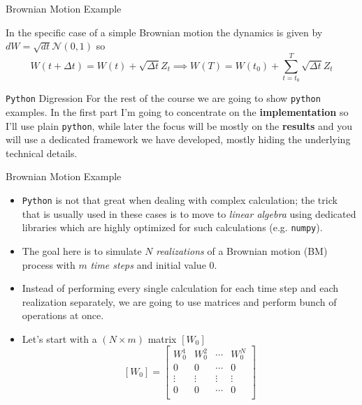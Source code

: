 \documentclass{beamer}
\begin{document}
\begin{frame}[fragile]{Brownian Motion Example}

In the specific case of a simple Brownian motion the dynamics is given by $dW = \sqrt{dt}\mathcal{N}(0,1)$ so
\begin{equation}
W(t+\Delta t) = W(t) + \sqrt{\Delta t}Z_t \implies
W(T) = W(t_0) + \sum_{t=t_0}^{T} \sqrt{\Delta t}Z_t
\label{eq:bm_evolution}
\end{equation}

\begin{block}{\texttt{Python} Digression}
For the rest of the course we are going to show \texttt{python} examples. In the first part I'm going to concentrate on the \textbf{implementation} so I'll use plain \texttt{python}, while later the focus will be mostly on the \textbf{results} and you will use a dedicated framework we have developed, mostly hiding the underlying technical details.
\end{block}
\end{frame}

\begin{frame}{Brownian Motion Example}
\begin{itemize}
    \item \texttt{Python} is not that great when dealing with complex calculation; the trick that is usually used in these cases is to move to \emph{linear algebra} using dedicated libraries which are highly optimized for such calculations (e.g. \texttt{numpy}).
    \item The goal here is to simulate $N$ \emph{realizations} of a Brownian motion (BM) process with $m$ \textit{time steps} and initial value 0. 
    \item Instead of performing every single calculation for each time step and each realization separately, we are going to use matrices and perform bunch of operations at once.
    \item Let's start with a $(N\times m)$ matrix $[W_0]$
    $$
    [W_0] =
    \begin{bmatrix}
    W^1_0 & W^2_0 & \cdots & W^N_0 \\
    0 & 0 & \cdots & 0 \\
    \vdots & \vdots & \vdots & \vdots \\
    0 & 0 & \cdots & 0 \\
    \end{bmatrix}
    $$
    \end{itemize}
\end{frame}
\end{document}
